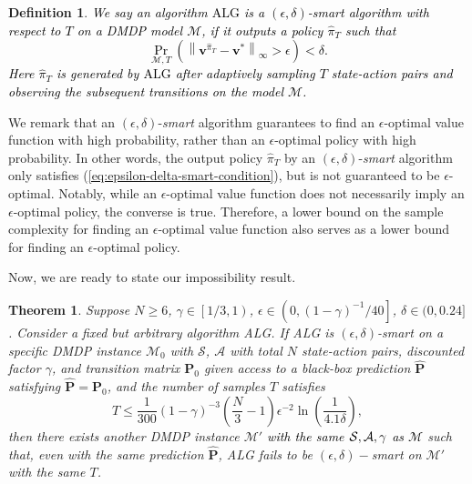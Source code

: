 \documentclass[12pt]{article}
\newtheorem{theorem}{Theorem}
\newtheorem{definition}{Definition}
\begin{document}
\begin{definition}
    \textcolor{black}{
    We say an algorithm $\text{ALG}$ is a $(\epsilon,\delta)$-\textit{smart} algorithm with respect to $T$ on a DMDP model $\mathcal{M}$, if it outputs a policy $\hat{\pi}_T$ such that
    \begin{equation}
        \Pr_{\mathcal{M},T} \left( \left\| \boldsymbol{v}^{\hat{\pi}_T} - \boldsymbol{v}^* \right \|_{\infty}  >\epsilon \right) < \delta.
        \label{eq:epsilon-delta-smart-condition}
    \end{equation}
    Here $\hat{\pi}_T$ is generated by $\text{ALG}$ after adaptively sampling $T$ state-action pairs and observing the subsequent transitions on the model $\mathcal{M}$.}
\end{definition}

We remark that an $(\epsilon,\delta)$-\textit{smart} algorithm guarantees to find an $\epsilon$-optimal value function with high probability, rather than an $\epsilon$-optimal policy with high probability. 
In other words, the output policy $\hat{\pi}_T$ by an $(\epsilon,\delta)$-\textit{smart} algorithm only satisfies (\ref{eq:epsilon-delta-smart-condition}), but is not guaranteed to be $\epsilon$-optimal.
Notably, while an $\epsilon$-optimal value function does not necessarily imply an $\epsilon$-optimal policy, the converse is true. Therefore, a lower bound on the sample complexity for finding an $\epsilon$-optimal value function also serves as a lower bound for finding an $\epsilon$-optimal policy. 

Now, we are ready to state our impossibility result. 

\begin{theorem}
    Suppose $N \ge 6$, $\gamma \in \left[1/3,1\right)$, $\epsilon \in \left (0,(1-\gamma)^{-1}/40 \right]$, $\delta \in (0,0.24]$. 
    Consider a fixed but arbitrary algorithm ALG. If ALG is $(\epsilon,\delta)$-\textit{smart} on a specific DMDP instance $\mathcal{M}_0$ with $\mathcal{S}$, $\mathcal{A}$ with total $N$ state-action pairs, discounted factor $\gamma$, and transition matrix $\boldsymbol{\text{P}}_0$ given access to a black-box prediction $\hat{\boldsymbol{\text{P}}}$ satisfying $\hat{\boldsymbol{\text{P}}} = \boldsymbol{\text{P}}_0$, and the number of samples $T$ satisfies
    \begin{equation}
        T \le \frac{1}{300}(1-\gamma)^{-3} \left(\frac{N}{3}-1 \right) \epsilon^{-2} \ln\left(\frac{1}{4.1\delta}\right),
        \label{eq:impossibility-result-T}
    \end{equation}
    then there exists another DMDP instance $\mathcal{M}'$ \textcolor{black}{with the same ${\cal S}, {\cal A}, \gamma$ as $\mathcal{M}$} such that, even with the same prediction $\hat{\boldsymbol{\text{P}}}$, ALG fails to be $(\epsilon,\delta)-$\textit{smart} on $\mathcal{M}'$ with the same $T$.
    \label{thm:impossibility-result}
\end{theorem}
\end{document}
